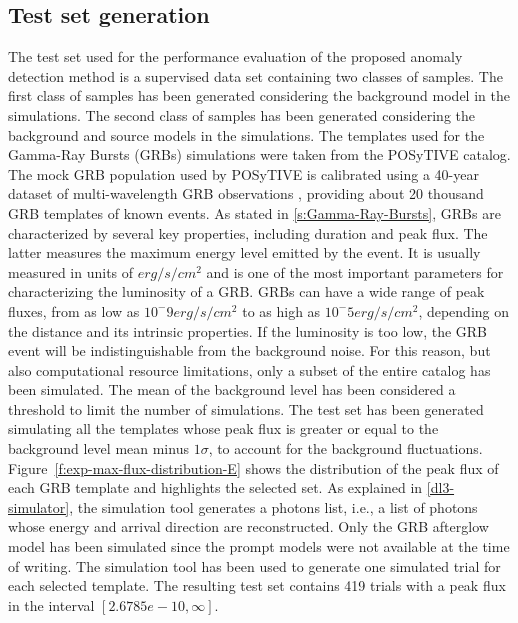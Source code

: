 \subsection{Test set generation}
\label{s:Experiment-Data}
The test set used for the performance evaluation of the proposed anomaly detection method is a supervised data set containing two classes of samples. The first class of samples has been generated considering the background model in the simulations. The second class of samples has been generated considering the background and source models in the simulations. The templates used for the Gamma-Ray Bursts (GRBs) simulations were taken from the POSyTIVE catalog. The mock GRB population used by POSyTIVE is calibrated using a 40-year dataset of multi-wavelength GRB observations \cite{Bernardini_2019}, providing about 20 thousand GRB templates of known events.
As stated in \autoref{s:Gamma-Ray-Bursts}, GRBs are characterized by several key properties, including duration and peak flux. The latter measures the maximum energy level emitted by the event. It is usually measured in units of $erg/s/cm^2$ and is one of the most important parameters for characterizing the luminosity of a GRB. GRBs can have a wide range of peak fluxes, from as low as $10^-9 erg/s/cm^2$ to as high as $10^-5 erg/s/cm^2$, depending on the distance and its intrinsic properties. If the luminosity is too low, the GRB event will be indistinguishable from the background noise. For this reason, but also computational resource limitations, only a subset of the entire catalog has been simulated. 
The mean of the background level has been considered a threshold to limit the number of simulations. The test set has been generated simulating all the templates whose peak flux is greater or equal to the background level mean minus $1\sigma$, to account for the background fluctuations. Figure~\ref{f:exp-max-flux-distribution-E} shows the distribution of the peak flux of each GRB template and highlights the selected set. As explained in \autoref{dl3-simulator}, the simulation tool generates a photons list, i.e., a list of photons whose energy and arrival direction are reconstructed. Only the GRB afterglow model has been simulated since the prompt models were not available at the time of writing. The simulation tool has been used to generate one simulated trial for each selected template. The resulting test set contains 419 trials with a peak flux in the interval $[2.6785e-10, \infty]$.
